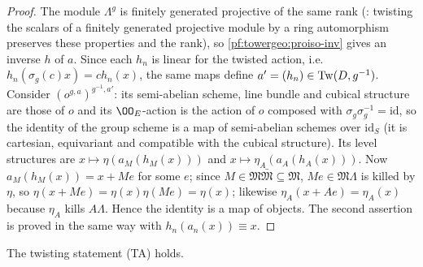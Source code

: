 \begin{proof}
The module $\Lambda^g$ is finitely generated projective of the same rank
(: twisting the scalars of a finitely
generated projective module by a ring automorphism preserves these properties and the rank), so
\cref{pf:towergeo:proiso-inv} gives an inverse $h$ of $a$. Since each $h_n$ is linear for the twisted
action, i.e.\ $h_n(\sigma_g(c)x)=ch_n(x)$, the same maps define $a'=(h_n)\in\mathrm{Tw}(D,g^{-1})$.
Consider $(o^{g,a})^{g^{-1},a'}$: its semi-abelian scheme, line bundle and cubical structure are those of
$o$ and its $\OO_E$-action is the action of $o$ composed with $\sigma_g\sigma_g^{-1}=\mathrm{id}$, so the
identity of the group scheme is a map of semi-abelian schemes over $\mathrm{id}_S$ (it is cartesian,
equivariant and compatible with the cubical structure). Its level structures are
$x\mapsto\eta(a_M(h_M(x)))$ and $x\mapsto\eta_A(a_A(h_A(x)))$. Now $a_M(h_M(x))=x+Me$ for some $e$; since
$M\in\mathfrak M\bar{\mathfrak M}\subseteq\mathfrak M$, $Me\in\mathfrak M\Lambda$ is killed by $\eta$, so
$\eta(x+Me)=\eta(x)\eta(Me)=\eta(x)$; likewise $\eta_A(x+Ae)=\eta_A(x)$ because $\eta_A$ kills $A\Lambda$.
Hence the identity is a map of objects. The second assertion is proved in the same way with
$h_n(a_n(x))\equiv x$.
\end{proof}

\begin{theorem}\label{pf:towergeo:twist}
The twisting statement \textup{(TA)} holds.
\end{theorem}

